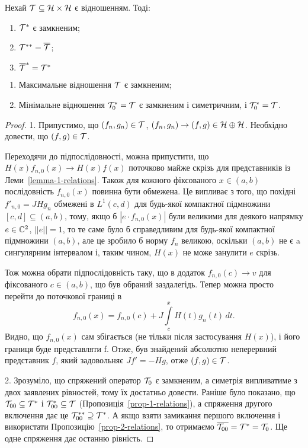 \begin{proposition} \label{prop-2-relations}
	Нехай $\mathcal{T}\subseteq\mathcal{H}\times\mathcal{H}$ є відношенням. Тоді:
	\begin{enumerate}
		\item $\mathcal{T}^*$ є замкненим;
		\item $\mathcal{T}^{**}=\overline{\mathcal{T}}$;
		\item $\overline{\mathcal{T}}^* = \mathcal{T}^*$
	\end{enumerate}
\end{proposition}

\begin{theorem}
	\begin{enumerate}
		\
		\item Максимальне відношення $\mathcal{T}$ є замкненим;
		\item Мінімальне відношення $\mathcal{T}^*_0=\mathcal{T}$ є замкненим і симетричним, і $\mathcal{T}^*_0=\mathcal{T}$.
	\end{enumerate}
\end{theorem}
\begin{proof}
	1. Припустимо, що $(f_n,g_n)\in\mathcal{T}$, $(f_n,g_n)\to (f,g)\in\mathcal{H}\oplus\mathcal{H}$. Необхідно довести, що $(f,g)\in\mathcal{T}$.

	Переходячи до підпослідовності, можна припустити, що $H(x)f_{n,0}(x)\to H(x)f(x)$ поточково майже скрізь для представників із Леми~\ref{lemma-1-relations}. Також для кожного фіксованого $x\in(a,b)$ послідовність $f_{n,0}(x)$ повинна бути обмежена. Це випливає з того, що похідні $f'_{n,0}=JHg_n$ обмежені в $L^1(c,d)$ для будь-якої компактної підмножини $[c,d]\subseteq(a,b)$, тому, якщо б $|e\cdot f_{n,0}(x)|$ були великими для деякого напрямку $e\in\mathbb{C}^2$, $||e||=1$, то те саме було б справедливим для будь-якої компактної підмножини $(a,b)$, але це зробило б норму $f_n$ великою, оскільки $(a,b)$ не є a сингулярним інтервалом і, таким чином, $H(x)$ не може занулити $e$ скрізь.

	Тож можна обрати підпослідовність таку, що в додаток $f_{n,0}(c)\to v$ для фіксованого $c\in(a,b)$, що був обраний заздалегідь. Тепер можна просто перейти до поточкової границі в 
	\begin{equation*}
		f_{n,0}(x) = f_{n,0}(c) + J\int\limits_c^x H(t)g_n(t)\,dt.
	\end{equation*}
	Видно, що $f_{n,0}(x)$ сам збігається (не тільки після застосування $H(x)$), і його границя буде представляти f. Отже, був знайдений абсолютно неперервний представник $f$, який задовольняє $Jf'=-Hg$, отже $(f,g)\in\mathcal{T}$.

	2. Зрозуміло, що спряжений оператор $\mathcal{T}_0$ є замкненим, а симетрія випливатиме з двох заявлених рівностей, тому їх достатньо довести. Раніше було показано, що $\mathcal{T}_{00}\subseteq\mathcal{T}^*$ і $\mathcal{T}^*_{00}\subseteq\mathcal{T}$ (Пропозиція~\ref{prop-1-relations}), а спряження другого включення дає це $\mathcal{T}^{**}_{00}\supseteq\mathcal{T}^*$. А якщо взяти замикання першого включення і використати Пропозицію~\ref{prop-2-relations}, то отримаємо $\overline{\mathcal{T}_{00}} = \mathcal{T}^* = \mathcal{T}_0$. Ще одне спряження дає останню рівність.
\end{proof}

